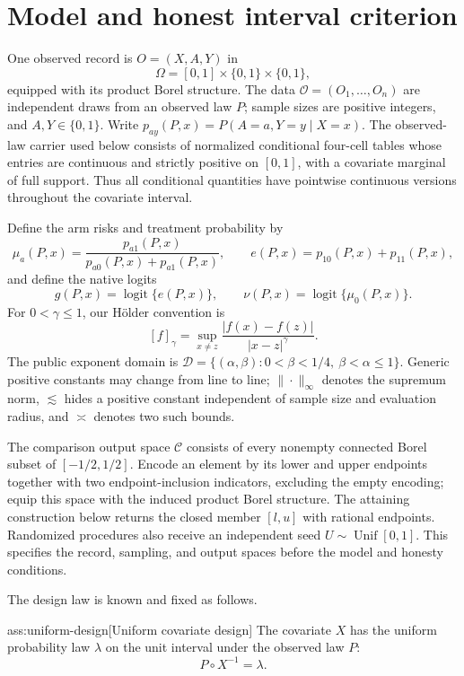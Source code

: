 \section{Model and honest interval criterion}

One observed record is \(O=(X,A,Y)\) in
\[
\Omega=[0,1]\times\{0,1\}\times\{0,1\},
\]
equipped with its product Borel structure. The data
\(\mathcal O=(O_1,\ldots,O_n)\) are independent draws from an observed law
\(P\); sample sizes are positive integers, and \(A,Y\in\{0,1\}\). Write
\(p_{ay}(P,x)=P(A=a,Y=y\mid X=x)\). The observed-law carrier used below
consists of normalized conditional four-cell tables whose entries are
continuous and strictly positive on \([0,1]\), with a covariate marginal of
full support. Thus all conditional quantities have pointwise continuous
versions throughout the covariate interval.

Define the arm risks and treatment probability by
\[
\mu_a(P,x)=\frac{p_{a1}(P,x)}{p_{a0}(P,x)+p_{a1}(P,x)},
\qquad
e(P,x)=p_{10}(P,x)+p_{11}(P,x),
\]
and define the native logits
\[
g(P,x)=\operatorname{logit}\{e(P,x)\},
\qquad
\nu(P,x)=\operatorname{logit}\{\mu_0(P,x)\}.
\]
For \(0<\gamma\le1\), our Hölder convention is
\[
[f]_\gamma=\sup_{x\ne z}\frac{|f(x)-f(z)|}{|x-z|^\gamma}.
\]
The public exponent domain is
\(\mathcal D=\{(\alpha,\beta):0<\beta<1/4,\ \beta<\alpha\le1\}\).
Generic positive constants may change from line to line; \(\|\cdot\|_\infty\)
denotes the supremum norm, \(\lesssim\) hides a positive constant independent
of sample size and evaluation radius, and \(\asymp\) denotes two such bounds.

The comparison output space \(\mathcal C\) consists of every nonempty connected
Borel subset of \([-1/2,1/2]\). Encode an element by its lower and upper
endpoints together with two endpoint-inclusion indicators, excluding the empty
encoding; equip this space with the induced product Borel structure. The
attaining construction below returns the closed member \([l,u]\) with rational
endpoints. Randomized procedures also receive an independent seed
\(U\sim\operatorname{Unif}[0,1]\).
This specifies the record, sampling, and output spaces before the model and
honesty conditions.

The design law is known and fixed as follows.

\begin{assumptionv}{ass:uniform-design}[Uniform covariate design]
The covariate \(X\) has the uniform probability law \(\lambda\) on the unit interval under the observed law \(P\):
\[
P\circ X^{-1}=\lambda.
\]
\end{assumptionv}

